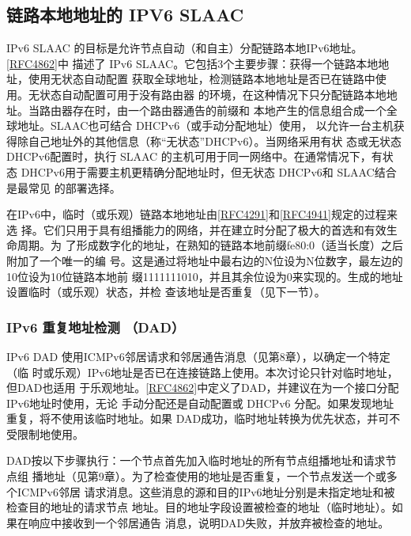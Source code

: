 \subsection{链路本地地址的 IPV6 SLAAC}

IPv6 SLAAC
的目标是允许节点自动（和自主）分配链路本地IPv6地址。\href{https://www.rfc-editor.org/rfc/rfc4862}{\href{https://www.rfc-editor.org/rfc/rfc4862}{[RFC4862]}}中
描述了 IPv6 SLAAC。它包括3个主要步骤：获得一个链路本地地址，使用无状态自动配置
获取全球地址，检测链路本地地址是否已在链路中使用。无状态自动配置可用于没有路由器
的环境，在这种情况下只分配链路本地地址。当路由器存在时，由一个路由器通告的前缀和
本地产生的信息组合成一个全球地址。SLAAC也可结合 DHCPv6（或手动分配地址）使用，
以允许一台主机获得除自己地址外的其他信息（称“无状态”DHCPv6）。当网络采用有状
态或无状态 DHCPv6配置时，执行 SLAAC 的主机可用于同一网络中。在通常情况下，有状
态 DHCPv6用于需要主机更精确分配地址时，但无状态 DHCPv6和 SLAAC结合是最常见
的部署选择。

在IPv6中，临时（或乐观）链路本地地址由\href{https://www.rfc-editor.org/rfc/rfc4291}{\href{https://www.rfc-editor.org/rfc/rfc4291}{[RFC4291]}}和\href{https://www.rfc-editor.org/rfc/rfc4941}{\href{https://www.rfc-editor.org/rfc/rfc4941}{[RFC4941]}}规定的过程来选
择。它们只用于具有组播能力的网络，并在建立时分配了极大的首选和有效生命周期。为
了形成数字化的地址，在熟知的链路本地前缀fe80:0（适当长度）之后附加了一个唯一的编
号。这是通过将地址中最右边的N位设为N位数字，最左边的10位设为10位链路本地前
缀1111111010，并且其余位设为0来实现的。生成的地址设置临时（或乐观）状态，并检
查该地址是否重复（见下一节）。

\subsubsection{IPv6 重复地址检测 （DAD）}
IPv6 DAD 使用ICMPv6邻居请求和邻居通告消息（见第8章），以确定一个特定（临
时或乐观）IPv6地址是否已在连接链路上使用。本次讨论只针对临时地址，但DAD也适用
于乐观地址。\href{https://www.rfc-editor.org/rfc/rfc4862}{\href{https://www.rfc-editor.org/rfc/rfc4862}{[RFC4862]}}中定义了DAD，并建议在为一个接口分配
IPv6地址时使用，无论
手动分配还是自动配置或 DHCPv6 分配。如果发现地址重复，将不使用该临时地址。如果
DAD成功，临时地址转换为优先状态，并可不受限制地使用。

DAD按以下步骤执行：一个节点首先加入临时地址的所有节点组播地址和请求节点组
播地址（见第9章）。为了检查使用的地址是否重复，一个节点发送一个或多个ICMPv6邻居
请求消息。这些消息的源和目的IPv6地址分别是未指定地址和被检查目的地址的请求节点
地址。目的地址字段设置被检查的地址（临时地址）。如果在响应中接收到一个邻居通告
消息，说明DAD失败，并放弃被检查的地址。

